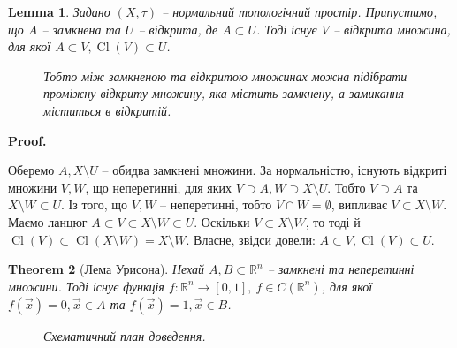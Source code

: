 \documentclass[a4paper, 10pt]{article}
\makeatletter
\def\qed{$\blacksquare$}
\theoremstyle{theoremdd}
\newtheorem{theorem}{Theorem}[subsection]
\theoremstyle{theoremdd}
\theoremstyle{theoremdd}
\theoremstyle{theoremdd}
\theoremstyle{theoremdd}
\theoremstyle{theoremdd}
\theoremstyle{theoremdd}
\newtheorem{lemma}[theorem]{Lemma}
\theoremstyle{theoremdd}
\renewenvironment{proof}[1][Proof.\\]{\par
\pushQED{\hfill \qed}%
\normalfont \topsep6\p@\@plus6\p@\relax
\trivlist
\item\relax
{\bfseries
#1\@addpunct{.}}\hspace\labelsep\ignorespaces
}{%
\popQED\endtrivlist\@endpefalse
}
\DeclareMathOperator{\Cl}{Cl}
\makeatother
\begin{document}
\begin{lemma}
Задано $(X,\tau)$ -- нормальний топологічний простір. Припустимо, що $A$ -- замкнена та $U$ -- відкрита, де $A \subset U$. Тоді існує $V$ -- відкрита множина, для якої $A \subset V, \Cl(V) \subset U$.
\begin{figure}[H]
\centering
{}
\caption*{Тобто між замкненою та відкритою множинах можна підібрати проміжну відкриту множину, яка містить замкнену, а замикання міститься в відкритій.}
\end{figure}
\end{lemma}

\begin{proof}
Оберемо $A, X \setminus U$ -- обидва замкнені множини. За нормальністю, існують відкриті множини $V,W$, що неперетинні, для яких $V \supset A, W \supset X \setminus U$. Тобто $V \supset A$ та $X \setminus W \subset U$. Із того, що $V,W$ -- неперетинні, тобто $V \cap W = \emptyset$, випливає $V \subset X \setminus W$. Маємо ланцюг $A \subset V \subset X \setminus W \subset U$. Оскільки $V \subset X \setminus W$, то тоді й $\Cl(V) \subset \Cl(X \setminus W) = X \setminus W$. Власне, звідси довели: $A \subset V, \Cl(V) \subset U$.
\end{proof}

\begin{theorem}[Лема Урисона]
Нехай $A,B \subset \mathbb{R}^n$ -- замкнені та неперетинні множини. Тоді існує функція $f \colon \mathbb{R}^n \to [0,1],\ f \in C(\mathbb{R}^n)$, для якої $f(\vec{x}) = 0, \vec{x} \in A$ та $f(\vec{x}) = 1, \vec{x} \in B$.
\begin{figure}[H]
\centering
{}
\caption*{Схематичний план доведення.}
\end{figure}
\end{theorem}
\end{document}

